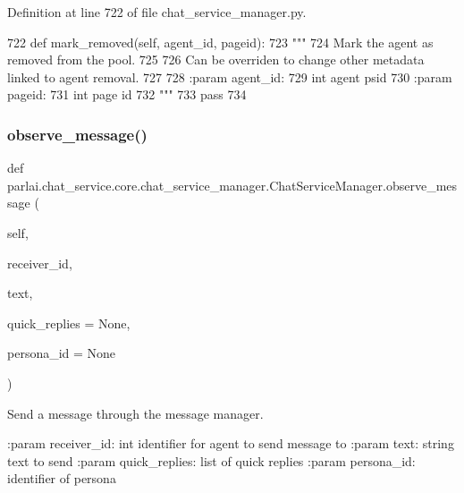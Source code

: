 Definition at line 722 of file chat\+\_\+service\+\_\+manager.\+py.


\begin{DoxyCode}
722     \textcolor{keyword}{def }mark\_removed(self, agent\_id, pageid):
723         \textcolor{stringliteral}{"""}
724 \textcolor{stringliteral}{        Mark the agent as removed from the pool.}
725 \textcolor{stringliteral}{}
726 \textcolor{stringliteral}{        Can be overriden to change other metadata linked to agent removal.}
727 \textcolor{stringliteral}{}
728 \textcolor{stringliteral}{        :param agent\_id:}
729 \textcolor{stringliteral}{            int agent psid}
730 \textcolor{stringliteral}{        :param pageid:}
731 \textcolor{stringliteral}{            int page id}
732 \textcolor{stringliteral}{        """}
733         \textcolor{keywordflow}{pass}
734 
\end{DoxyCode}
\mbox{\label{classparlai_1_1chat__service_1_1core_1_1chat__service__manager_1_1ChatServiceManager_a9e1d99a460b0e21ec47e9a3ae09d73a0}} 
\subsubsection{\texorpdfstring{observe\+\_\+message()}{observe\_message()}}
{\footnotesize\ttfamily def parlai.\+chat\+\_\+service.\+core.\+chat\+\_\+service\+\_\+manager.\+Chat\+Service\+Manager.\+observe\+\_\+message (\begin{DoxyParamCaption}\item[{}]{self,  }\item[{}]{receiver\+\_\+id,  }\item[{}]{text,  }\item[{}]{quick\+\_\+replies = {\ttfamily None},  }\item[{}]{persona\+\_\+id = {\ttfamily None} }\end{DoxyParamCaption})}

\begin{DoxyVerb}Send a message through the message manager.

:param receiver_id:
    int identifier for agent to send message to
:param text:
    string text to send
:param quick_replies:
    list of quick replies
:param persona_id:
    identifier of persona
\end{DoxyVerb}
 


